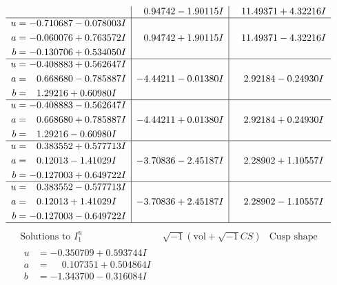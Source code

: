 \documentclass[1p]{elsarticle_modified}
\theoremstyle{definition}
\newcommand{\I}{\sqrt{-1}}
\begin{document}
$$\begin{array}{c|c|c}
 & \phantom{-}0.94742 - 1.90115 I & \phantom{-}11.49371 + 4.32216 I \\ \hline\begin{aligned}
u &= -0.710687 - 0.078003 I \\
a &= -0.060076 + 0.763572 I \\
b &= -0.130706 + 0.534050 I\end{aligned}
 & \phantom{-}0.94742 + 1.90115 I & \phantom{-}11.49371 - 4.32216 I \\ \hline\begin{aligned}
u &= -0.408883 + 0.562647 I \\
a &= \phantom{-}0.668680 - 0.785887 I \\
b &= \phantom{-}1.29216 + 0.60980 I\end{aligned}
 & -4.44211 - 0.01380 I & \phantom{-}2.92184 - 0.24930 I \\ \hline\begin{aligned}
u &= -0.408883 - 0.562647 I \\
a &= \phantom{-}0.668680 + 0.785887 I \\
b &= \phantom{-}1.29216 - 0.60980 I\end{aligned}
 & -4.44211 + 0.01380 I & \phantom{-}2.92184 + 0.24930 I \\ \hline\begin{aligned}
u &= \phantom{-}0.383552 + 0.577713 I \\
a &= \phantom{-}0.12013 - 1.41029 I \\
b &= -0.127003 + 0.649722 I\end{aligned}
 & -3.70836 - 2.45187 I & \phantom{-}2.28902 + 1.10557 I \\ \hline\begin{aligned}
u &= \phantom{-}0.383552 - 0.577713 I \\
a &= \phantom{-}0.12013 + 1.41029 I \\
b &= -0.127003 - 0.649722 I\end{aligned}
 & -3.70836 + 2.45187 I & \phantom{-}2.28902 - 1.10557 I\\
 \hline 
 \end{array}$$\newpage$$\begin{array}{c|c|c}  
\text{Solutions to }I^u_{1}& \I (\text{vol} + \sqrt{-1}CS) & \text{Cusp shape}\\
 \hline 
\begin{aligned}
u &= -0.350709 + 0.593744 I \\
a &= \phantom{-}0.107351 + 0.504864 I \\
b &= -1.343700 - 0.316084 I\end{aligned}

\end{array}$$
\end{document}
